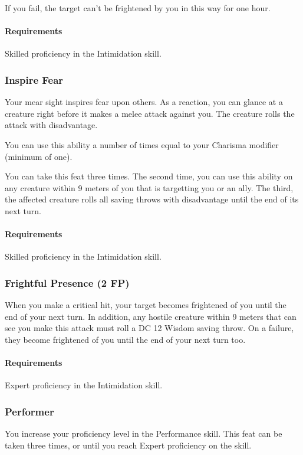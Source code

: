     If you fail, the target can't be frightened by you in this way for one hour.
    \paragraph{Requirements} Skilled proficiency in the Intimidation skill.
\subsubsection{Inspire Fear} \label{feat::inspirefear}
    Your mear sight inspires fear upon others.
    As a reaction, you can glance at a creature right before it makes a melee attack against you.
    The creature rolls the attack with disadvantage.

    You can use this ability a number of times equal to your Charisma modifier (minimum of one).

    You can take this feat three times.
    The second time, you can use this ability on any creature within 9 meters of you that is targetting you or an ally.
    The third, the affected creature rolls all saving throws with disadvantage until the end of its next turn.
    \paragraph{Requirements} Skilled proficiency in the Intimidation skill.
\subsubsection{Frightful Presence (2 FP)} \label{feat::frightfulpresence}
    When you make a critical hit, your target becomes frightened of you until the end of your next turn.
    In addition, any hostile creature within 9 meters that can see you make this attack must roll a DC 12 Wisdom saving throw.
    On a failure, they become frightened of you until the end of your next turn too.
    \paragraph{Requirements} Expert proficiency in the Intimidation skill.
\subsubsection{Performer} \label{feat::performer}
    You increase your proficiency level in the Performance skill.
    This feat can be taken three times, or until you reach Expert proficiency on the skill.
